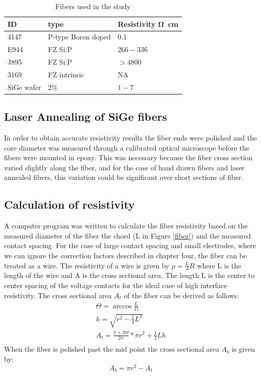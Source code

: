  \begin{table}[h]
\begin{center}
    \begin{tabular}{|l|l|l|  }
    \hline
    \textbf{ID} & \textbf{type} & \textbf{Resistivity \si{\ohm \cm}}   \\ \hline
    4147 & P-type Boron doped & 0.1 \\
    E944 & FZ Si:P &$266-336$\\
    J895 & FZ Si:P & $> 4800$    \\
    3169 & FZ intrinsic & NA\\
    SiGe wafer & 2\%&$1-7$\\
     \hline
    \end{tabular}
\end{center}
\caption{Fibers used in the study}
\label{Tab1}
\end{table}


\subsection{Laser Annealing of SiGe fibers}

In order to obtain accurate resistivity results the fiber ends were polished and the core diameter was measured through a calibrated optical microscope before the fibers were mounted in epoxy. This was necessary because the 
fiber cross section varied slightly along the fiber, and for the case of hand drawn fibers and laser annealed fibers, this variation could be significant over short sections of fiber. 

\subsection{Calculation of resistivity}
A computer program was written to calculate the fiber resistivity based on the measured diameter of the fiber the chord (L in Figure \ref{fiber}) and the measured contact spacing. 
For the case of large contact spacing and small electrodes, where we can ignore the correction factors described in chapter four, the fiber can be treated as a wire. The resistivity of a wire is given by $\rho = \frac{L}{A}R$
where L is the length of the wire and A is the cross sectional area. The length L is the center to center spacing of the voltage contacts for the ideal case of high interface resistivity. The cross sectional area $A_t$ of the fiber can be derived as follows: \begin{align}
\Theta = \arccos{\frac{L}{D}}    \\
h = \sqrt{r^2-\frac{1}{2}L^2} \\
    A_t = \frac{\pi+2\Theta}{2\pi}*\pi r^2 + \frac{1}{2}Lh\\
\end{align}    
When the fiber is polished past the mid point the cross sectional area $A_b$ is given by: \begin{equation}
    A_b = \pi r^2 -A_t
\end{equation}

